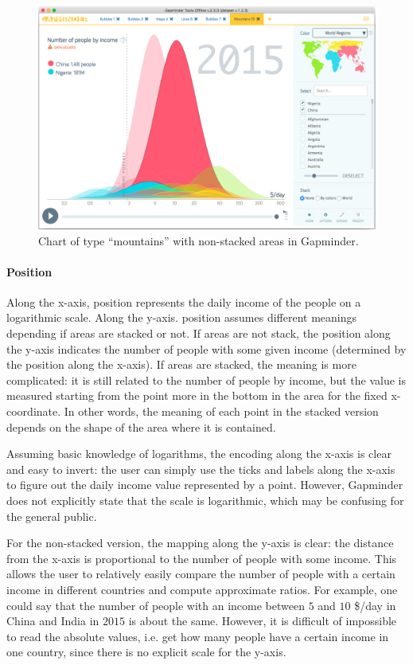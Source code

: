 \begin{figure}[h]
	\centering
	\includegraphics[width=0.95\columnwidth]{figures/mountains-non-stacked}
	\caption{Chart of type ``mountains'' with non-stacked areas in Gapminder.}
	\label{fig:mountains-non-stacked}
\end{figure}

\paragraph{Position}
Along the x-axis, position represents the daily income of the people on a logarithmic scale.
Along the y-axis. position assumes different meanings depending if areas are stacked or not.
If areas are not stack, the position along the y-axis indicates the number of people with some given income (determined by the position along the x-axis).
If areas are stacked, the meaning is more complicated:
it is still related to the number of people by income, but the value is measured starting from the point more in the bottom in the area for the fixed x-coordinate.
In other words, the meaning of each point in the stacked version depends on the shape of the area where it is contained.

Assuming basic knowledge of logarithms, the encoding along the x-axis is clear and easy to invert:
the user can simply use the ticks and labels along the x-axis to figure out the daily income value represented by a point.
However, Gapminder does not explicitly state that the scale is logarithmic, which may be confusing for the general public.

For the non-stacked version, the mapping along the y-axis is clear: the distance from the x-axis is proportional to the number of people with some income.
This allows the user to relatively easily compare the number of people with a certain income in different countries and compute approximate ratios.
For example, one could say that the number of people with an income between $5$ and $10$ \$/day in China and India in $2015$ is about the same.
However, it is difficult of impossible to read the absolute values, i.e. get how many people have a certain income in one country, since there is no explicit scale for the y-axis.

